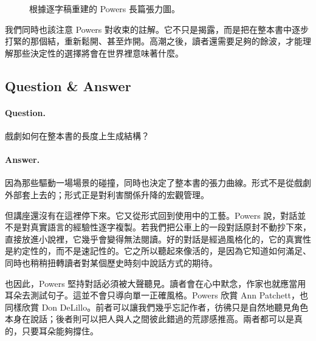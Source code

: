 \begin{figure}[h]
\centering
{}
\caption{根據逐字稿重建的 Powers 長篇張力圖。}
\end{figure}

我們同時也該注意 Powers 對收束的註解。它不只是揭露，而是把在整本書中逐步打緊的那個結，重新鬆開、甚至炸開。高潮之後，讀者還需要足夠的餘波，才能理解那些決定性的選擇將會在世界裡意味著什麼。

\subsection{Question \& Answer}

\paragraph{Question.} 戲劇如何在整本書的長度上生成結構？

\paragraph{Answer.} 因為那些驅動一場場景的碰撞，同時也決定了整本書的張力曲線。形式不是從戲劇外部套上去的；形式正是對利害關係升降的宏觀管理。

但講座還沒有在這裡停下來。它又從形式回到使用中的工藝。Powers 說，對話並不是對真實語言的經驗性逐字複製。若我們把公車上的一段對話原封不動抄下來，直接放進小說裡，它幾乎會變得無法閱讀。好的對話是經過風格化的，它的真實性是約定性的，而不是速記性的。它之所以聽起來像活的，是因為它知道如何滿足、同時也稍稍扭轉讀者對某個歷史時刻中說話方式的期待。

也因此，Powers 堅持對話必須被大聲聽見。讀者會在心中默念，作家也就應當用耳朵去測試句子。這並不會只導向單一正確風格。Powers 欣賞 Ann Patchett，也同樣欣賞 Don DeLillo。前者可以讓我們幾乎忘記作者，彷彿只是自然地聽見角色本身在說話；後者則可以把人與人之間彼此錯過的荒謬感推高。兩者都可以是真的，只要耳朵能夠撐住。

